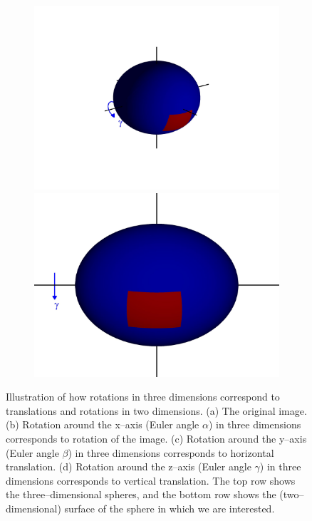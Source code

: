 \documentclass[11pt]{article}
\begin{document}
\begin{figure}
\begin{subfigure}{0.2\textwidth}
\caption{}
\end{subfigure}
\begin{subfigure}{0.2\textwidth}
\includegraphics[width=\textwidth]{sphere_4}
\includegraphics[width=\textwidth]{sphere2_4}
\caption{}
\end{subfigure}
\caption{Illustration of how rotations in three dimensions correspond to translations and rotations in two dimensions. (a) The original image. (b) Rotation around the x--axis (Euler angle $\alpha$) in three dimensions corresponds to rotation of the image. (c) Rotation around the y--axis (Euler angle $\beta$) in three dimensions corresponds to horizontal translation. (d) Rotation around the z--axis (Euler angle $\gamma$) in three dimensions corresponds to vertical translation. The top row shows the three--dimensional spheres, and the bottom row shows the (two--dimensional) surface of the sphere in which we are interested.}
\label{fig:SO3_picture}
\end{figure}
\end{document}
